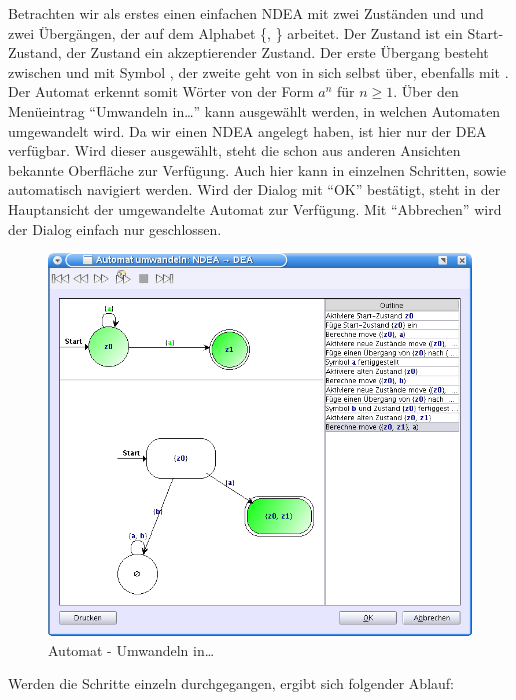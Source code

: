 Betrachten wir als erstes einen einfachen NDEA mit zwei Zuständen  und
 und zwei Übergängen, der auf dem Alphabet \{, \}
arbeitet. Der Zustand  ist ein Start-Zustand, der Zustand 
ein akzeptierender Zustand. Der erste Übergang besteht zwischen  und
 mit Symbol , der zweite geht von  in sich selbst
über, ebenfalls mit . Der Automat erkennt somit Wörter von der Form
$a^n$ für $n \geq 1$. Über den Menüeintrag "`Umwandeln in\ldots"' kann ausgewählt
werden, in welchen Automaten umgewandelt wird. Da wir einen NDEA angelegt haben,
ist hier nur der DEA verfügbar. Wird dieser ausgewählt, steht die schon aus
anderen Ansichten bekannte Oberfläche zur Verfügung. Auch hier kann in einzelnen
Schritten, sowie automatisch navigiert werden. Wird der Dialog mit "`OK"'
bestätigt, steht in der Hauptansicht der umgewandelte Automat zur Verfügung. Mit
"`Abbrechen"' wird der Dialog einfach nur geschlossen.\vspace{10pt}

\begin{figure}[h]
\begin{center}
\includegraphics[width=12cm]{images/convert_to.png}
\caption{Automat - Umwandeln in\ldots}
\end{center}
\end{figure}

Werden die Schritte einzeln durchgegangen, ergibt sich folgender Ablauf:

